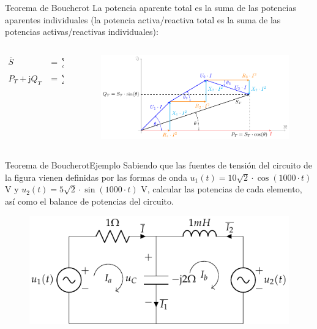 \documentclass[aspectratio=169, xcolor={usenames,svgnames,dvipsnames}]{beamer}
\begin{document}
\begin{frame}{Teorema de Boucherot}
La potencia aparente total es la suma de las potencias aparentes individuales (la potencia activa/reactiva total es la suma de las potencias activas/reactivas individuales):
\begin{columns}
\begin{column}{0.3\columnwidth}
\begin{align*}
  \overline{S} &= \sum_{i = 1}^{n} \overline{S}_i\\
  P_T + \mathrm{j}Q_T &= \sum^n_{i = 1} (P_i + \mathrm{j}Q_i)
\end{align*}
\end{column}
\begin{column}{0.7\linewidth}
\begin{figure}
		\centering
		\includegraphics[width=\linewidth]{../figs/boucherot.pdf}
	\end{figure}
\end{column}
\end{columns}
\end{frame}

\begin{frame}{Teorema de Boucherot}{Ejemplo}
    Sabiendo que las fuentes de tensión del circuito de la figura vienen definidas por las formas de onda $u_1(t)=10\sqrt{2}\cdot \cos(1000\cdot t)$ V y $u_2(t)=5\sqrt{2}\cdot \sin(1000\cdot t)$ V, calcular las potencias de cada elemento, así como el balance de potencias del circuito. 
		\begin{figure}[H]
			\centering
			\includegraphics[width=0.6\linewidth]{../figs/ej7_BT2.pdf}
		\end{figure}
\end{frame}
\end{document}

